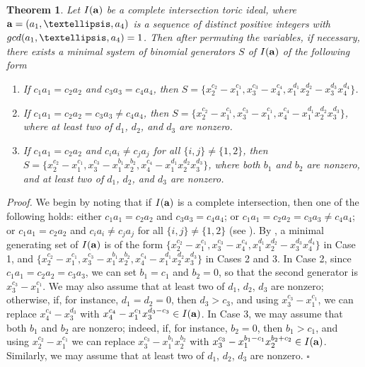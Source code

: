 \documentclass[10pt,a4paper]{amsart}
\newtheorem{thm1}{Theorem}[section]
\begin{document}
\begin{thm1} \label{CasesMinimal} Let $I({\bf a})$ be a complete intersection toric ideal, where ${\bf a}=(a_1,\ldots,a_4)$ is a sequence of distinct positive integers with ${\rm gcd}(a_1,\ldots,a_4)=1$. Then after permuting the variables, if necessary, there exists a minimal system of binomial generators $S$ of $I({\bf a})$ of the following form \begin{enumerate} \item[{\rm CASE 1:}] If $c_{1}a_{1}=c_{2}a_{2}$ and $c_{3}a_{3}=c_{4}a_{4}$, then $S=\{x_{2}^{c_2}-x_{1}^{c_1}, x_{3}^{c_3}-x_{4}^{c_4}, x_{1}^{d_1}x_{2}^{d_2}-x_{3}^{d_3}x_{4}^{d_4}\}$. \item[{\rm CASE 2:}] If $c_{1}a_{1}=c_{2}a_{2}=c_{3}a_{3} \neq c_{4}a_{4}$, then $S=\{x_{2}^{c_2}-x_{1}^{c_1}, x_{3}^{c_3}-x_{1}^{c_1}, x_{4}^{c_4}-x_{1}^{d_1}x_{2}^{d_2}x_{3}^{d_3}\}$, where at least two of $d_1$, $d_2$, and $d_3$ are nonzero. \item[{\rm CASE 3:}] If $c_{1}a_{1}=c_{2}a_{2}$ and $c_{i}a_{i} \neq c_{j}a_{j}$ for all $\{i,j\} \neq \{1,2\}$, then $S=\{x_{2}^{c_2}-x_{1}^{c_1}, x_{3}^{c_3}-x_{1}^{b_1}x_{2}^{b_2}, x_{4}^{c_4}-x_{1}^{d_1}x_{2}^{d_2}x_{3}^{d_3}\}$, where both $b_1$ and $b_2$ are nonzero, and at least two of $d_1$, $d_2$, and $d_3$ are nonzero.
\end{enumerate}
\end{thm1}

{\em \noindent Proof.} We begin by noting that if $I({\bf a})$ is a complete intersection, then one of the following holds: either $c_1a_1=c_2a_2$ and $c_3a_3=c_4a_4$; or $c_{1}a_{1}=c_{2}a_{2}=c_{3}a_{3} \neq c_{4}a_{4}$; or $c_{1}a_{1}=c_{2}a_{2}$ and $c_{i}a_{i} \neq c_{j}a_{j}$ for all $\{i,j\} \neq \{1,2\}$ (see \cite{KO}). By \cite[Proposition 3.2]{Shi}, a minimal generating set of $I({\bf a})$ is of the form $\{x_{2}^{c_2}-x_{1}^{c_1}, x_{3}^{c_3}-x_{4}^{c_4}, x_{1}^{d_1}x_{2}^{d_2}-x_{3}^{d_3}x_{4}^{d_4}\}$ in Case 1, and $\{x_{2}^{c_2}-x_{1}^{c_1}, x_{3}^{c_3}-x_{1}^{b_1}x_{2}^{b_2}, x_{4}^{c_4}-x_{1}^{d_1}x_{2}^{d_2}x_{3}^{d_3}\}$ in Cases 2 and 3. In Case 2, since $c_{1}a_1=c_{2}a_2=c_{3}a_{3}$, we can set $b_{1}=c_1$ and $b_2=0$, so that the second generator is $x_{3}^{c_3}-x_{1}^{c_1}$. We may also assume that at least two of $d_1$, $d_2$, $d_3$ are nonzero; otherwise, if, for instance, $d_{1}=d_{2}=0$, then $d_{3}>c_3$, and using $x_{3}^{c_3}-x_{1}^{c_1}$, we can replace $x_{4}^{c_4}-x_{3}^{d_3}$ with $x_{4}^{c_4}-x_{1}^{c_1}x_{3}^{d_3-c_3} \in I({\bf a})$. In Case 3, we may assume that both $b_1$ and $b_2$ are nonzero; indeed, if, for instance, $b_2=0$, then $b_1>c_1$, and using $x_2^{c_2}-x_1^{c_1}$ we can replace $x_3^{c_3} - x_1^{b_1}x_2^{b_2}$ with $x_3^{c_3}-x_1^{b_1-c_1}x_2^{b_2+c_2} \in I({\bf a})$. Similarly, we may assume that at least two of $d_1$, $d_2$, $d_3$ are nonzero. \hfill $\square$ \par\vspace{0.5\baselineskip}
\end{document}
